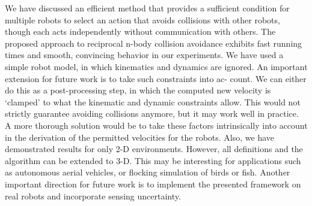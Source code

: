 \documentclass[12pt]{report}
\begin{document}
We have discussed an efficient method that provides a sufficient condition for multiple robots to select an action that avoids collisions with other robots, though each acts independently without communication with others. The proposed approach to reciprocal n-body collision avoidance exhibits fast running times and smooth, convincing behavior in our experiments. We have used a simple robot model, in which kinematics and dynamics are ignored. An important extension for future work is to take such constraints into ac-
count. We can either do this as a post-processing step, in which the computed new
velocity is ‘clamped’ to what the kinematic and dynamic constraints allow. This
would not strictly guarantee avoiding collisions anymore, but it may work well in
practice. A more thorough solution would be to take these factors intrinsically
into account in the derivation of the permitted velocities for the robots. Also, we have demonstrated results for only 2-D environments. However, all definitions and the algorithm can be extended to 3-D. This may be interesting for applications such as autonomous aerial vehicles, or flocking simulation of birds or fish. Another important direction for future work is to implement the presented framework on real robots and incorporate sensing uncertainty.
\end{document}
